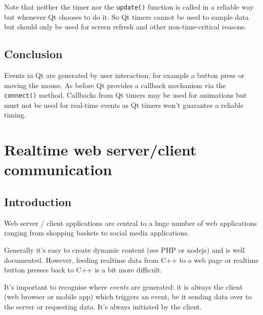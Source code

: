 \documentclass[12pt]{report}
\begin{document}
Note that neither the timer nor the \texttt{update()} function
is called in a reliable way but whenever Qt chooses to do it.
So Qt timers cannot be used to sample data but should
only be used for screen refresh and other non-time-critical
reasons.

\section{Conclusion}
Events in Qt are generated by user interaction, for example a button
press or moving the mouse. As before Qt provides a callback mechanism
via the \texttt{connect()} method. Callbacks from Qt timers may be used for
animations but must not be used for real-time events as Qt timers won't
guarantee a reliable timing.




\chapter{Realtime web server/client communication}

\section{Introduction}

Web server / client applications are central to a huge number
of web applications ranging from shopping baskets to social
media applications.

Generally it's easy to create dynamic content (see PHP or nodejs) and is well
documented. However, feeding realtime data from C++ to a web page or
realtime button presses back to C++ is a bit more difficult.

It's important to recognise where \textsl{events} are generated: it is
always the client (web browser or mobile app) which triggers an event,
be it sending data over to the server or requesting data. It's
always initiated by the client.
\end{document}

